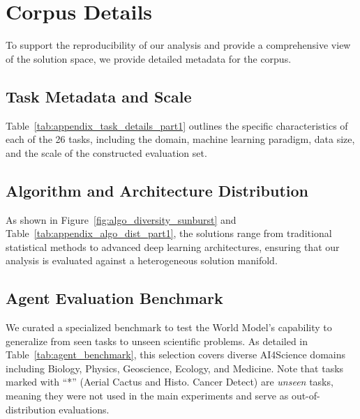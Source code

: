 \section{Corpus Details}
\label{apendix:corpus_details}

To support the reproducibility of our analysis and provide a comprehensive view of the solution space, we provide detailed metadata for the corpus.


\subsection{Task Metadata and Scale}
\label{sec:appendix_task_detail}
Table~\ref{tab:appendix_task_details_part1} outlines the specific characteristics of each of the 26 tasks, including the domain, machine learning paradigm, data size, and the scale of the constructed evaluation set.


\subsection{Algorithm and Architecture Distribution}
\label{sec:appendix_algo_details} %

As shown in Figure~\ref{fig:algo_diversity_sunburst} and Table~\ref{tab:appendix_algo_dist_part1}, the solutions range from traditional statistical methods to advanced deep learning architectures, ensuring that our analysis is evaluated against a heterogeneous solution manifold.





\subsection{Agent Evaluation Benchmark}
\label{sec:appendix_agent_benchmark}

We curated a specialized benchmark to test the World Model's capability to generalize from seen tasks to unseen scientific problems. As detailed in Table~\ref{tab:agent_benchmark}, this selection covers diverse AI4Science domains including Biology, Physics, Geoscience, Ecology, and Medicine. Note that tasks marked with ``*'' (Aerial Cactus and Histo. Cancer Detect) are \textit{unseen} tasks, meaning they were not used in the main experiments and serve as out-of-distribution evaluations.




